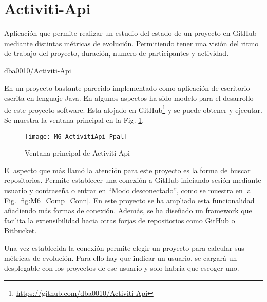 
\section{Activiti-Api}

\epigraph{Aplicación que permite realizar un estudio del estado de un proyecto en GitHub mediante distintas métricas de evolución. Permitiendo tener una visión del ritmo de trabajo del proyecto, duración, numero de participantes y actividad.}{dba0010/Activiti-Api}

En un proyecto bastante parecido implementado como aplicación de escritorio escrita en lenguaje Java. En algunos aspectos ha sido modelo para el desarrollo de este proyecto software. Esta alojado en GitHub\footnote{\url{https://github.com/dba0010/Activiti-Api}} y se puede obtener y ejecutar. Se muestra la ventana principal en la Fig. \ref{fig:M6_ActivitiApi_Ppal}.

\begin{figure}[h!]
	\centering
	\texttt{[image: M6\_ActivitiApi\_Ppal]}
	\caption{Ventana principal de Activiti-Api}\label{fig:M6_ActivitiApi_Ppal}
\end{figure}

El aspecto que más llamó la atención para este proyecto es la forma de buscar repositorios. Permite establecer una conexión a GitHub iniciando sesión mediante usuario y contraseña o entrar en ``Modo desconectado'', como se muestra en la Fig. \ref{fig:M6_Comp_Conn}. En este proyecto se ha ampliado esta funcionalidad añadiendo más formas de conexión. Además, se ha diseñado un framework que facilita la extensibilidad hacia otras forjas de repositorios como GitHub o Bitbucket.


Una vez establecida la conexión permite elegir un proyecto para calcular sus métricas de evolución. Para ello hay que indicar un usuario, se cargará un desplegable con los proyectos de ese usuario y solo habría que escoger uno.

